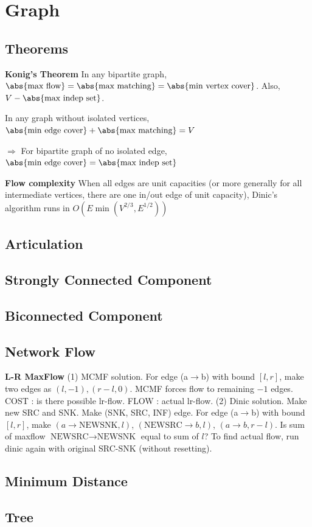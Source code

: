\chapter{Graph}

\section{Theorems}
{\footnotesize\textbf{Konig's Theorem} In any bipartite graph, $\abs{\text{max flow}} = \abs{\text{max matching}} = \abs{\text{min vertex cover}}$. Also, $V - \abs{\text{max indep set}}$.

In any graph without isolated vertices, $\abs{\text{min edge cover}} + \abs{\text{max matching}} = V$

$\Rightarrow$ For bipartite graph of no isolated edge,  $\abs{\text{min edge cover}} = \abs{\text{max indep set}}$

\textbf{Flow complexity} When all edges are unit capacities (or more generally for all intermediate vertices, there are one in/out edge of unit capacity), Dinic's algorithm runs in $O(E \min(V^{2/3}, E^{1/2}))$}

\section{Articulation}
\section{Strongly Connected Component}
\section{Biconnected Component}
\section{Network Flow}
    {\footnotesize
	\textbf{L-R MaxFlow} (1) MCMF solution. For edge (a$\to$b) with bound $[l, r]$, make two edges as $(l, -1), (r-l ,0)$. MCMF forces flow to remaining $-1$ edges. COST : is there possible lr-flow. FLOW : actual lr-flow. (2) Dinic solution. Make new SRC and SNK. Make (SNK, SRC, INF) edge. For edge (a$\to$b) with bound $[l, r]$, make $(a \to \text{NEWSNK}, l)$, $(\text{NEWSRC} \to b, l)$, $(a\to b, r-l)$. Is sum of maxflow $\text{NEWSRC} \to \text{NEWSNK}$ equal to sum of $l$? To find actual flow, run dinic again with original SRC-SNK (without resetting).}
\section{Minimum Distance}
\section{Tree}
